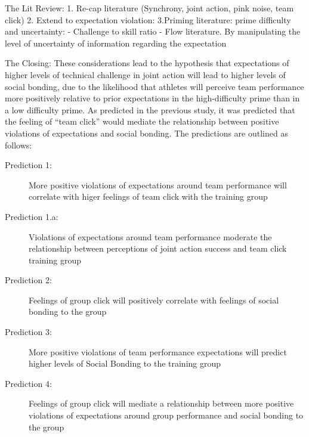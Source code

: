 \documentclass[english]{article}\usepackage[]{graphicx}\usepackage[]{color}
\begin{document}
The Lit Review:
1. Re-cap literature (Synchrony, joint action, pink noise, team click)
2. Extend to expectation violation:
3.Priming literature: prime difficulty and uncertainty:
- Challenge to skill ratio - Flow literature.
By manipulating the level of uncertainty of information regarding the expectation






The Closing:
These considerations lead to the hypothesis that expectations of higher levels of technical challenge in joint action will lead to higher levels of social bonding, due to the likelihood that athletes will perceive team performance more positively relative to prior expectations in the high-difficulty prime than in a low difficulty prime.  As predicted in the previous study, it was predicted that the feeling of ``team click'' would mediate the relationship between positive violations of expectations and social bonding.  The predictions are outlined as follows:
\begin{description}
\item[Prediction 1:] More positive violations of expectations around team performance will correlate with higer feelings of team click with the training group
\item[Prediction 1.a:] Violations of expectations around team performance moderate the relationship between perceptions of joint action success and team click training group
\item[Prediction 2:] Feelings of group click will positively correlate with feelings of social bonding to the group
\item[Prediction 3:] More positive violations of team performance expectations will predict higher levels of Social Bonding to the training group
\item[Prediction 4:] Feelings of group click will mediate a relationship between more positive violations of expectations around group performance and social bonding to the group
\end{description}
\end{document}
